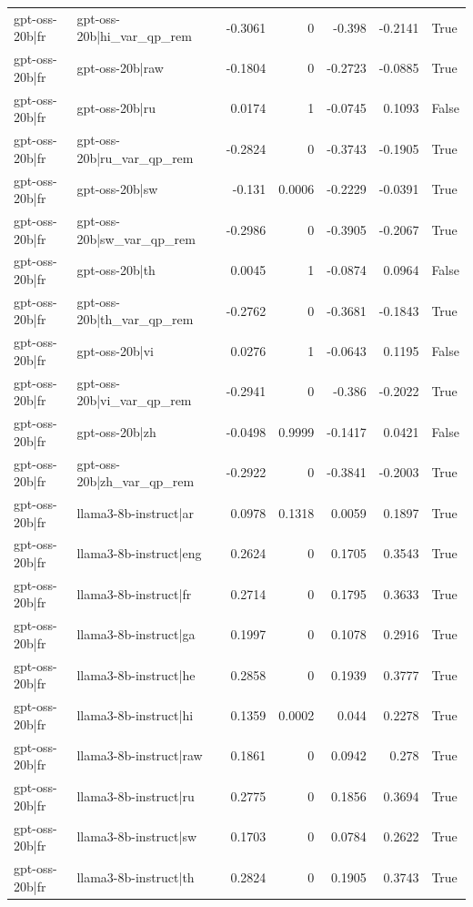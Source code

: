 \begin{table}
\begin{tabular}{l l r r r r l}
gpt-oss-20b|fr & gpt-oss-20b|hi_var_qp_rem & -0.3061 & 0 & -0.398 & -0.2141 & True \\
gpt-oss-20b|fr & gpt-oss-20b|raw & -0.1804 & 0 & -0.2723 & -0.0885 & True \\
gpt-oss-20b|fr & gpt-oss-20b|ru & 0.0174 & 1 & -0.0745 & 0.1093 & False \\
gpt-oss-20b|fr & gpt-oss-20b|ru_var_qp_rem & -0.2824 & 0 & -0.3743 & -0.1905 & True \\
gpt-oss-20b|fr & gpt-oss-20b|sw & -0.131 & 0.0006 & -0.2229 & -0.0391 & True \\
gpt-oss-20b|fr & gpt-oss-20b|sw_var_qp_rem & -0.2986 & 0 & -0.3905 & -0.2067 & True \\
gpt-oss-20b|fr & gpt-oss-20b|th & 0.0045 & 1 & -0.0874 & 0.0964 & False \\
gpt-oss-20b|fr & gpt-oss-20b|th_var_qp_rem & -0.2762 & 0 & -0.3681 & -0.1843 & True \\
gpt-oss-20b|fr & gpt-oss-20b|vi & 0.0276 & 1 & -0.0643 & 0.1195 & False \\
gpt-oss-20b|fr & gpt-oss-20b|vi_var_qp_rem & -0.2941 & 0 & -0.386 & -0.2022 & True \\
gpt-oss-20b|fr & gpt-oss-20b|zh & -0.0498 & 0.9999 & -0.1417 & 0.0421 & False \\
gpt-oss-20b|fr & gpt-oss-20b|zh_var_qp_rem & -0.2922 & 0 & -0.3841 & -0.2003 & True \\
gpt-oss-20b|fr & llama3-8b-instruct|ar & 0.0978 & 0.1318 & 0.0059 & 0.1897 & True \\
gpt-oss-20b|fr & llama3-8b-instruct|eng & 0.2624 & 0 & 0.1705 & 0.3543 & True \\
gpt-oss-20b|fr & llama3-8b-instruct|fr & 0.2714 & 0 & 0.1795 & 0.3633 & True \\
gpt-oss-20b|fr & llama3-8b-instruct|ga & 0.1997 & 0 & 0.1078 & 0.2916 & True \\
gpt-oss-20b|fr & llama3-8b-instruct|he & 0.2858 & 0 & 0.1939 & 0.3777 & True \\
gpt-oss-20b|fr & llama3-8b-instruct|hi & 0.1359 & 0.0002 & 0.044 & 0.2278 & True \\
gpt-oss-20b|fr & llama3-8b-instruct|raw & 0.1861 & 0 & 0.0942 & 0.278 & True \\
gpt-oss-20b|fr & llama3-8b-instruct|ru & 0.2775 & 0 & 0.1856 & 0.3694 & True \\
gpt-oss-20b|fr & llama3-8b-instruct|sw & 0.1703 & 0 & 0.0784 & 0.2622 & True \\
gpt-oss-20b|fr & llama3-8b-instruct|th & 0.2824 & 0 & 0.1905 & 0.3743 & True \\

\end{tabular}
\end{table}
